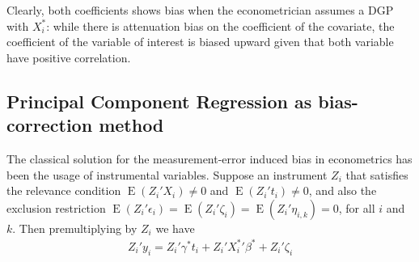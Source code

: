 \documentclass[10pt]{article}
\begin{document}
        Clearly, both coefficients shows bias when the econometrician assumes a DGP with $X_i^*$: while there is attenuation bias on the coefficient of the covariate, the coefficient of the variable of interest is biased upward given that both variable have positive correlation.
        
        \subsection*{Principal Component Regression as bias-correction method}
        
        The classical solution for the measurement-error induced bias in econometrics has been the usage of instrumental variables. Suppose an instrument $Z_i$ that satisfies the relevance condition $\operatorname{E}(Z_i'X_i)\neq 0$ and $\operatorname{E}(Z_i't_i)\neq 0$, and also the exclusion restriction $\operatorname{E}(Z_i'\epsilon_i)=\operatorname{E}(Z_i'\zeta_i)=\operatorname{E}(Z_i'\eta_{i,k})=0$, for all $i$ and $k$. Then premultiplying by $Z_i$ we have
        \begin{align}
            Z_i'y_i =  Z_i'\gamma^* t_i +  Z_i'{X^{*}_i}' \beta^* +  Z_i'\zeta_i
        \end{align}
        
\end{document}
